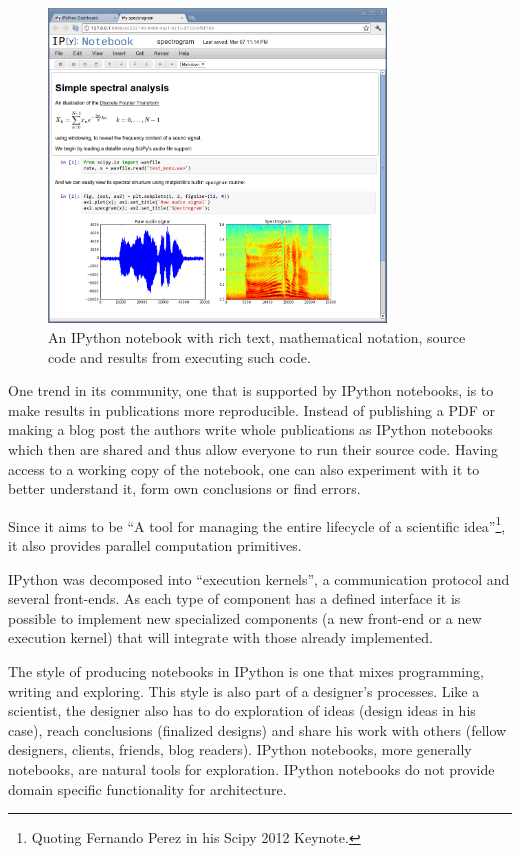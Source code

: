 \documentclass{./llncs2e/llncs}
\begin{document}
	\begin{figure}
		\centering
		\includegraphics[width=0.8\textwidth]{img/ipython_notebook}
		\caption{An IPython notebook with rich text, mathematical notation, source code and results from executing such code.}
		\label{fig:ipython:notebook}
	\end{figure}
	
	One trend in its community, one that is supported by IPython notebooks, is to make results in publications more reproducible. 
	Instead of publishing a PDF or making a blog post the authors write whole publications as IPython notebooks which then are shared and thus allow everyone to run their source code. 
	Having access to a working copy of the notebook, one can also experiment with it to better understand it, form own conclusions or find errors.
	
	Since it aims to be ``A tool for managing the entire lifecycle of a scientific idea''\footnote{Quoting Fernando Perez in his Scipy 2012 Keynote.}, it also provides parallel computation primitives.
	
	IPython was decomposed into ``execution kernels'', a communication protocol and several front-ends. 
	As each type of component has a defined interface it is possible to implement new specialized components (a new front-end or a new execution kernel) that will integrate with those already implemented.
	
	The style of producing notebooks in IPython is one that mixes programming, writing and exploring. 
	This style is also part of a designer's processes. 
	Like a scientist, the designer also has to do exploration of ideas (design ideas in his case), reach conclusions (finalized designs) and share his work with others (fellow designers, clients, friends, blog readers). 
	IPython notebooks, more generally notebooks, are natural tools for exploration.
	IPython notebooks do not provide domain specific functionality for architecture.
	
\end{document}
